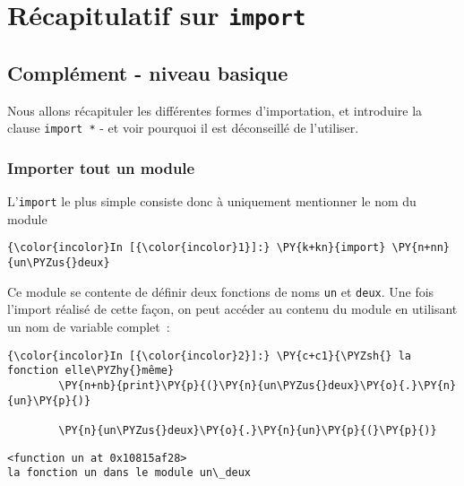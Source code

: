     
    
    
    

    

    \hypertarget{ruxe9capitulatif-sur-import}{%
\section{\texorpdfstring{Récapitulatif sur
\texttt{import}}{Récapitulatif sur import}}\label{ruxe9capitulatif-sur-import}}

    \hypertarget{compluxe9ment---niveau-basique}{%
\subsection{Complément - niveau
basique}\label{compluxe9ment---niveau-basique}}

    Nous allons récapituler les différentes formes d'importation, et
introduire la clause \texttt{import\ *} - et voir pourquoi il est
déconseillé de l'utiliser.

    \hypertarget{importer-tout-un-module}{%
\subsubsection{Importer tout un module}\label{importer-tout-un-module}}

    L'\texttt{import} le plus simple consiste donc à uniquement mentionner
le nom du module

    \begin{Verbatim}[commandchars=\\\{\}]
{\color{incolor}In [{\color{incolor}1}]:} \PY{k+kn}{import} \PY{n+nn}{un\PYZus{}deux}
\end{Verbatim}


    Ce module se contente de définir deux fonctions de noms \texttt{un} et
\texttt{deux}. Une fois l'import réalisé de cette façon, on peut accéder
au contenu du module en utilisant un nom de variable complet~:

    \begin{Verbatim}[commandchars=\\\{\}]
{\color{incolor}In [{\color{incolor}2}]:} \PY{c+c1}{\PYZsh{} la fonction elle\PYZhy{}même}
        \PY{n+nb}{print}\PY{p}{(}\PY{n}{un\PYZus{}deux}\PY{o}{.}\PY{n}{un}\PY{p}{)}
        
        \PY{n}{un\PYZus{}deux}\PY{o}{.}\PY{n}{un}\PY{p}{(}\PY{p}{)}
\end{Verbatim}


    \begin{Verbatim}[commandchars=\\\{\}]
<function un at 0x10815af28>
la fonction un dans le module un\_deux

    \end{Verbatim}

